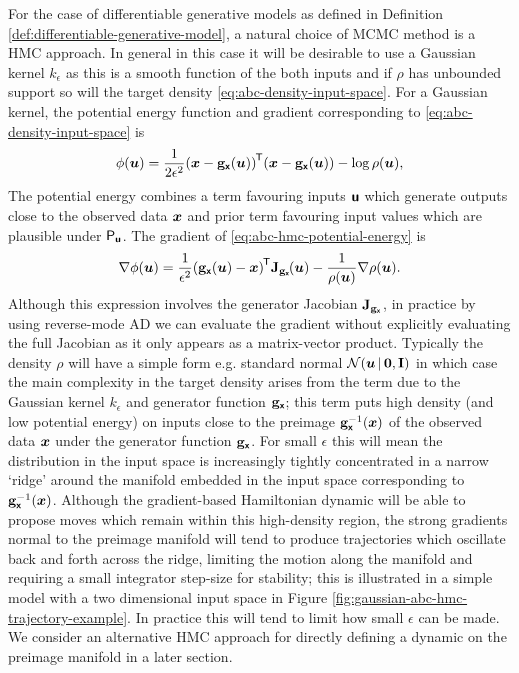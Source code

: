 For the case of differentiable generative models as defined in Definition \ref{def:differentiable-generative-model}, a natural choice of \ac{MCMC} method is a \ac{HMC} approach. In general in this case it will be desirable to use a Gaussian kernel $k_{\epsilon}$ as this is a smooth function of the both inputs and if $\rho$ has unbounded support so will the target density \eqref{eq:abc-density-input-space}. For a Gaussian kernel, the potential energy function and gradient corresponding to \eqref{eq:abc-density-input-space} is
\begin{equation}\label{eq:abc-hmc-potential-energy}
  \phi(\vct{u}) = \frac{1}{2\epsilon^2} 
  \lpa \vct{x} - \genfunc_{\rvct{x}}(\vct{u}) \rpa\tr\lpa \vct{x} - \genfunc_{\rvct{x}}(\vct{u}) \rpa -
  \log\rho(\vct{u}),
\end{equation}
The potential energy combines a term favouring inputs $\boldsymbol{\mathsf{u}}$ which generate outputs close to the observed data $\boldsymbol{x}$ and prior term favouring input values which are plausible under $\mathsf{P}_{\boldsymbol{\mathsf{u}}}$. The gradient of \eqref{eq:abc-hmc-potential-energy} is
\begin{equation}
  \grad{\phi}{\vct{u}} =
  \frac{1}{\epsilon^2} 
  \lpa \genfunc_{\rvct{x}}(\vct{u}) - \vct{x} \rpa\tr\jacob{\genfunc_{\rvct{x}}}{\vct{u}} - 
  \frac{1}{\rho(\vct{u})} \grad{\rho}{\vct{u}}.
\end{equation}
Although this expression involves the generator Jacobian $\mathbf{J}_{{\mathbf{g}}_{\boldsymbol{\mathsf{x}}}}$, in practice by using reverse-mode \ac{AD} we can evaluate the gradient without explicitly evaluating the full Jacobian as it only appears as a matrix-vector product. Typically the density $\rho$ will have a simple form e.g. standard normal $\nrm{\vct{u}\gvn\vct{0},\idmtx}$ in which case the main complexity in the target density arises from the term due to the Gaussian kernel $k_\epsilon$ and generator function ${\mathbf{g}}_{\boldsymbol{\mathsf{x}}}$; this term puts high density (and low potential energy) on inputs close to the preimage ${\mathbf{g}}_{\boldsymbol{\mathsf{x}}}^{-1}(\boldsymbol{x})$ of the observed data $\boldsymbol{x}$ under the generator function ${\mathbf{g}}_{\boldsymbol{\mathsf{x}}}$. For small $\epsilon$ this will mean the distribution in the input space is increasingly tightly concentrated in a narrow `ridge' around the manifold embedded in the input space corresponding to ${\mathbf{g}}_{\boldsymbol{\mathsf{x}}}^{-1}(\boldsymbol{x})$. Although the gradient-based Hamiltonian dynamic will be able to propose moves which remain within this high-density region, the strong gradients normal to the preimage manifold will tend to produce trajectories which oscillate back and forth across the ridge, limiting the motion along the manifold and requiring a small integrator step-size for stability; this is illustrated in a simple model with a two dimensional input space in Figure \ref{fig:gaussian-abc-hmc-trajectory-example}. In practice this will tend to limit how small $\epsilon$ can be made. We consider an alternative \ac{HMC} approach for directly defining a dynamic on the preimage manifold in a later section.

